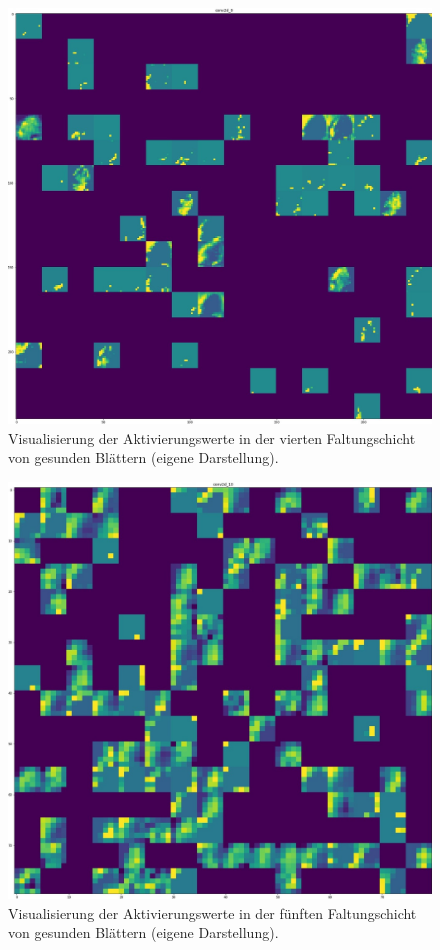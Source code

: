 \begin{figure}[h!]
	\centering
	\includegraphics[width=\textwidth]{visualisierungen/healthy/activation/healthy8.JPG}
	\caption{Visualisierung der Aktivierungswerte in der vierten Faltungschicht von gesunden Blättern (eigene Darstellung).}
	\label{}
\end{figure}

\begin{figure}[h!]
	\centering
	\includegraphics[width=\textwidth]{visualisierungen/healthy/activation/healthy10.JPG}
	\caption{Visualisierung der Aktivierungswerte in der fünften Faltungschicht von gesunden Blättern (eigene Darstellung).}
	\label{}
\end{figure}

